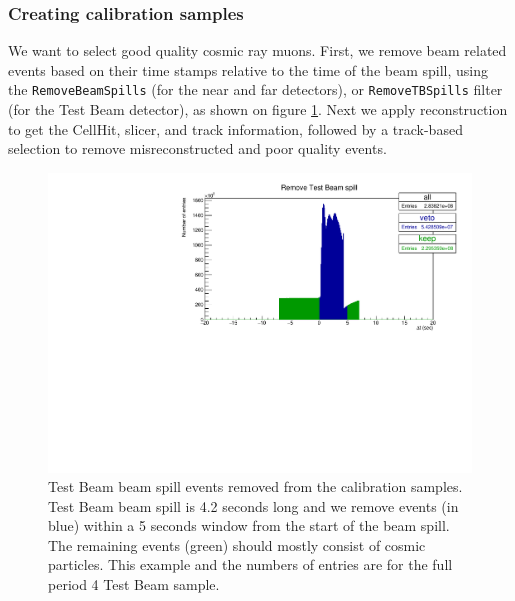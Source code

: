 \documentclass[12pt,a4paper]{article}
\begin{document}

\subsubsection*{Creating calibration samples}\label{secCreatingCalibrationSamples}

We want to select good quality cosmic ray muons. First, we remove beam related events based on their time stamps relative to the time of the beam spill, using the \texttt{RemoveBeamSpills} (for the near and far detectors), or \texttt{RemoveTBSpills} filter (for the Test Beam detector), as shown on figure \ref{figRemoveBeamSpill}. Next we apply reconstruction to get the CellHit, slicer, and track information, followed by a track-based selection to remove misreconstructed and poor quality events.

\begin{figure}[hbtp]
\centering
\includegraphics[width=\textwidth]{Plots/RemoveTBSpills.pdf}
\caption{Test Beam beam spill events removed from the calibration samples. Test Beam beam spill is 4.2 seconds long and we remove events (in blue) within a 5 seconds window from the start of the beam spill. The remaining events (green) should mostly consist of cosmic particles. This example and the numbers of entries are for the full period 4 Test Beam sample.}
\label{figRemoveBeamSpill}
\end{figure}
\end{document}
